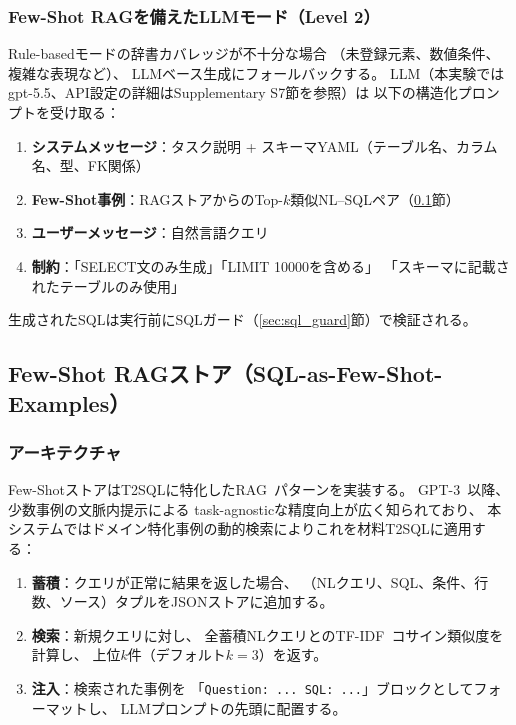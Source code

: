 \documentclass[5p,twocolumn]{elsarticle}
\begin{document}
\subsubsection{Few-Shot RAGを備えたLLMモード（Level 2）}
\label{sec:llm_mode}

Rule-basedモードの辞書カバレッジが不十分な場合
（未登録元素、数値条件、複雑な表現など）、
LLMベース生成にフォールバックする。
LLM（本実験ではgpt-5.5、API設定の詳細はSupplementary S7節を参照）は
以下の構造化プロンプトを受け取る：

\begin{enumerate}
  \item \textbf{システムメッセージ}：タスク説明 + スキーマYAML（テーブル名、カラム名、型、FK関係）
  \item \textbf{Few-Shot事例}：RAGストアからのTop-$k$類似NL--SQLペア（\ref{sec:few_shot}節）
  \item \textbf{ユーザーメッセージ}：自然言語クエリ
  \item \textbf{制約}：「SELECT文のみ生成」「LIMIT 10000を含める」
        「スキーマに記載されたテーブルのみ使用」
\end{enumerate}

生成されたSQLは実行前にSQLガード（\ref{sec:sql_guard}節）で検証される。

\subsection{Few-Shot RAGストア（SQL-as-Few-Shot-Examples）}
\label{sec:few_shot}

\subsubsection{アーキテクチャ}

Few-ShotストアはT2SQLに特化したRAG~\citep{lewis2020rag}パターンを実装する。
GPT-3~\citep{brown2020fewshot}以降、少数事例の文脈内提示による
task-agnosticな精度向上が広く知られており、
本システムではドメイン特化事例の動的検索によりこれを材料T2SQLに適用する：

\begin{enumerate}
  \item \textbf{蓄積}：クエリが正常に結果を返した場合、
    （NLクエリ、SQL、条件、行数、ソース）タプルをJSONストアに追加する。
  \item \textbf{検索}：新規クエリに対し、
    全蓄積NLクエリとのTF-IDF~\citep{salton1988tfidf}コサイン類似度を計算し、
    上位$k$件（デフォルト$k=3$）を返す。
  \item \textbf{注入}：検索された事例を
    「\texttt{Question: ... SQL: ...}」ブロックとしてフォーマットし、
    LLMプロンプトの先頭に配置する。
\end{enumerate}
\end{document}
